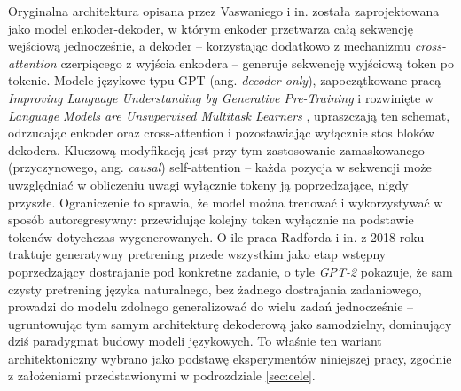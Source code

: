 \newline
Oryginalna architektura opisana przez Vaswaniego i in. została zaprojektowana jako model enkoder-dekoder, w którym enkoder przetwarza całą sekwencję wejściową jednocześnie, a dekoder -- korzystając dodatkowo z mechanizmu \textit{cross-attention} czerpiącego z wyjścia enkodera -- generuje sekwencję wyjściową token po tokenie. Modele językowe typu GPT (ang. \textit{decoder-only}), zapoczątkowane pracą \textit{Improving Language Understanding by Generative Pre-Training} \cite{radford_2018_improving_language_understanding} i rozwinięte w \textit{Language Models are Unsupervised Multitask Learners} \cite{radford_2019_language_models_unsupervised_multitask_learners}, upraszczają ten schemat, odrzucając enkoder oraz cross-attention i pozostawiając wyłącznie stos bloków dekodera. Kluczową modyfikacją jest przy tym zastosowanie zamaskowanego (przyczynowego, ang. \textit{causal}) self-attention -- każda pozycja w sekwencji może uwzględniać w obliczeniu uwagi wyłącznie tokeny ją poprzedzające, nigdy przyszłe. Ograniczenie to sprawia, że model można trenować i wykorzystywać w sposób autoregresywny: przewidując kolejny token wyłącznie na podstawie tokenów dotychczas wygenerowanych. O ile praca Radforda i in. z 2018 roku traktuje generatywny pretrening przede wszystkim jako etap wstępny poprzedzający dostrajanie pod konkretne zadanie, o tyle \textit{GPT-2} \cite{radford_2019_language_models_unsupervised_multitask_learners} pokazuje, że sam czysty pretrening języka naturalnego, bez żadnego dostrajania zadaniowego, prowadzi do modelu zdolnego generalizować do wielu zadań jednocześnie -- ugruntowując tym samym architekturę dekoderową jako samodzielny, dominujący dziś paradygmat budowy modeli językowych. To właśnie ten wariant architektoniczny wybrano jako podstawę eksperymentów niniejszej pracy, zgodnie z założeniami przedstawionymi w podrozdziale \ref{sec:cele}. \newline

